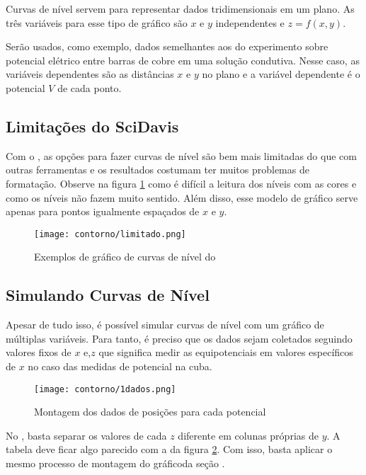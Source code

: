 Curvas de nível servem para representar dados tridimensionais em um plano. As três variáveis para esse tipo de gráfico são $x$ e $y$ independentes e $z = f(x,y)$.

Serão usados, como exemplo, dados semelhantes aos do experimento sobre potencial elétrico entre barras de cobre em uma solução condutiva. Nesse caso, as variáveis dependentes são as distâncias $x$ e $y$ no plano e a variável dependente é o potencial $V$ de cada ponto.


\subsection{Limitações do SciDavis}

    Com o \software, as opções para fazer curvas de nível são bem mais limitadas do que com outras ferramentas e os resultados costumam ter muitos problemas de formatação. Observe na figura \ref{fig:contorno:limitado} como é difícil a leitura dos níveis com as cores e como os níveis não fazem muito sentido. Além disso, esse modelo de gráfico serve apenas para pontos igualmente espaçados de $x$ e $y$.

    \begin{figure}[htbp]
        \centering
        \texttt{[image: contorno/limitado.png]}

        \caption{Exemplos de gráfico de curvas de nível do \software}
        \label{fig:contorno:limitado}
    \end{figure}


\subsection{Simulando Curvas de Nível}

    Apesar de tudo isso, é possível simular curvas de nível com um gráfico de múltiplas variáveis. Para tanto, é preciso que os dados sejam coletados seguindo valores fixos de $x$ e,$z$ que significa medir as equipotenciais em valores específicos de $x$ no caso das medidas de potencial na cuba.

    \begin{figure}[htbp]
        \centering
        \texttt{[image: contorno/1dados.png]}

        \caption{Montagem dos dados de posições para cada potencial}
        \label{fig:contorno:dados}
    \end{figure}

    No \software, basta separar os valores de cada $z$ diferente em colunas próprias de $y$. A tabela deve ficar algo parecido com a da figura \ref{fig:contorno:dados}. Com isso, basta aplicar o mesmo processo de montagem do gráficoda seção .


